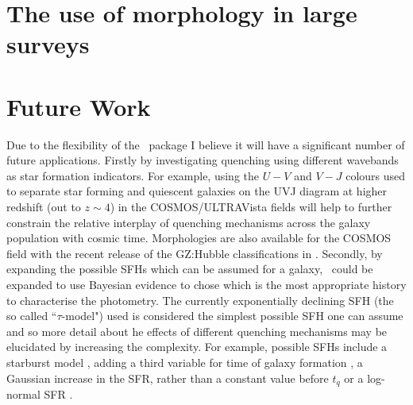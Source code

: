 \section{The use of morphology in large surveys}\label{sec:usemorph}

\section{Future Work}\label{sec:future}

Due to the flexibility of the \starpy\ package I believe it will have a significant number of future applications. Firstly by investigating quenching using different wavebands as star formation indicators. For example, using the $U-V$ and $V-J$ colours used to separate star forming and quiescent galaxies on the UVJ diagram \citep{ref} at higher redshift (out to $z\sim4$) in the COSMOS/ULTRAVista fields \citep[e.g. see work by][]{muzzin13} will help to further constrain the relative interplay of quenching mechanisms across the galaxy population with cosmic time. Morphologies are also available for the COSMOS field with the recent release of the GZ:Hubble classifications in \cite{willett16}. Secondly, by expanding the possible SFHs which can be assumed for a galaxy, \starpy\ could be expanded to use Bayesian evidence to chose which is the most appropriate history to characterise the photometry. The currently exponentially declining SFH (the so called ``$\tau$-model") used is considered the simplest possible SFH one can assume and so more detail about he effects of different quenching mechanisms may be elucidated by increasing the complexity. For example, possible SFHs include a starburst model \citep{ref}, adding a third variable for time of galaxy formation \citep{ref}, a Gaussian increase in the SFR, rather than a constant value before $t_q$ or a log-normal SFR \citep{gladders13, abramson16}. 

